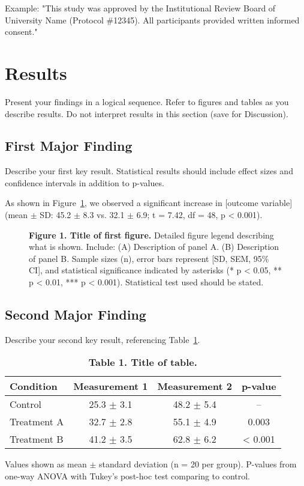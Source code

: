 \documentclass[10pt,letterpaper]{article}
\begin{document}
Example: "This study was approved by the Institutional Review Board of University Name (Protocol \#12345). All participants provided written informed consent."

\section*{Results}

Present your findings in a logical sequence. Refer to figures and tables as you describe results. Do not interpret results in this section (save for Discussion).

\subsection*{First Major Finding}
Describe your first key result. Statistical results should include effect sizes and confidence intervals in addition to p-values.

As shown in Figure~\ref{fig:results1}, we observed a significant increase in [outcome variable] (mean $\pm$ SD: 45.2 $\pm$ 8.3 vs. 32.1 $\pm$ 6.9; t = 7.42, df = 48, p < 0.001).

\begin{figure}[!ht]
\centering
\caption{{\bf Figure 1. Title of first figure.}
Detailed figure legend describing what is shown. Include: (A) Description of panel A. (B) Description of panel B. Sample sizes (n), error bars represent [SD, SEM, 95\% CI], and statistical significance indicated by asterisks (* p < 0.05, ** p < 0.01, *** p < 0.001). Statistical test used should be stated.}
\label{fig:results1}
\end{figure}

\subsection*{Second Major Finding}
Describe your second key result, referencing Table~\ref{tab:results1}.

\begin{table}[!ht]
\centering
\caption{{\bf Table 1. Title of table.}}
\label{tab:results1}
\begin{tabular}{lccc}
\hline
\textbf{Condition} & \textbf{Measurement 1} & \textbf{Measurement 2} & \textbf{p-value} \\
\hline
Control & 25.3 $\pm$ 3.1 & 48.2 $\pm$ 5.4 & -- \\
Treatment A & 32.7 $\pm$ 2.8 & 55.1 $\pm$ 4.9 & 0.003 \\
Treatment B & 41.2 $\pm$ 3.5 & 62.8 $\pm$ 6.2 & < 0.001 \\
\hline
\end{tabular}
\begin{flushleft}
Values shown as mean $\pm$ standard deviation (n = 20 per group). P-values from one-way ANOVA with Tukey's post-hoc test comparing to control.
\end{flushleft}
\end{table}
\end{document}
